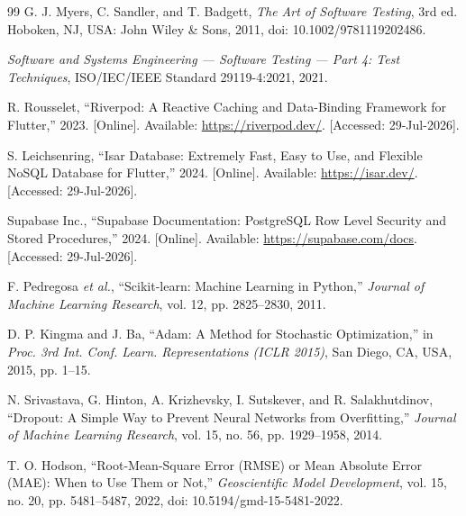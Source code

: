 \documentclass[10pt,a4paper]{article}
\begin{document}
\begin{thebibliography}{99}
G. J. Myers, C. Sandler, and T. Badgett, \textit{The Art of Software Testing}, 3rd ed. Hoboken, NJ, USA: John Wiley \& Sons, 2011, doi: 10.1002/9781119202486.

\textit{Software and Systems Engineering --- Software Testing --- Part 4: Test Techniques}, ISO/IEC/IEEE Standard 29119-4:2021, 2021.

R. Rousselet, ``Riverpod: A Reactive Caching and Data-Binding Framework for Flutter,'' 2023. [Online]. Available: \url{https://riverpod.dev/}. [Accessed: 29-Jul-2026].

S. Leichsenring, ``Isar Database: Extremely Fast, Easy to Use, and Flexible NoSQL Database for Flutter,'' 2024. [Online]. Available: \url{https://isar.dev/}. [Accessed: 29-Jul-2026].

Supabase Inc., ``Supabase Documentation: PostgreSQL Row Level Security and Stored Procedures,'' 2024. [Online]. Available: \url{https://supabase.com/docs}. [Accessed: 29-Jul-2026].

F. Pedregosa \textit{et al.}, ``Scikit-learn: Machine Learning in Python,'' \textit{Journal of Machine Learning Research}, vol. 12, pp. 2825--2830, 2011.

D. P. Kingma and J. Ba, ``Adam: A Method for Stochastic Optimization,'' in \textit{Proc. 3rd Int. Conf. Learn. Representations (ICLR 2015)}, San Diego, CA, USA, 2015, pp. 1--15.

N. Srivastava, G. Hinton, A. Krizhevsky, I. Sutskever, and R. Salakhutdinov, ``Dropout: A Simple Way to Prevent Neural Networks from Overfitting,'' \textit{Journal of Machine Learning Research}, vol. 15, no. 56, pp. 1929--1958, 2014.

T. O. Hodson, ``Root-Mean-Square Error (RMSE) or Mean Absolute Error (MAE): When to Use Them or Not,'' \textit{Geoscientific Model Development}, vol. 15, no. 20, pp. 5481--5487, 2022, doi: 10.5194/gmd-15-5481-2022.
\end{thebibliography}
\endgroup
\end{document}

